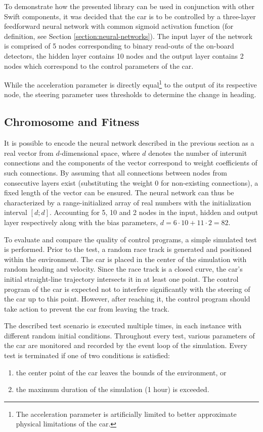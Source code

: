To demonstrate how the presented library can be used in conjunction with other Swift components, it was decided that the car is to be controlled by a three-layer feedforward neural network with common sigmoid activation function (for definition, see Section \ref{section:neural-networks}). The input layer of the network is comprised of 5 nodes corresponding to binary read-outs of the on-board detectors, the hidden layer contains 10 nodes and the output layer contains 2 nodes which correspond to the control parameters of the car.

While the acceleration parameter is directly equal\footnote{The acceleration parameter is artificially limited to better approximate physical limitations of the car.} to the output of its respective node, the steering parameter uses thresholds to determine the change in heading.

\subsection{Chromosome and Fitness}
It is possible to encode the neural network described in the previous section as a real vector from $d$-dimensional space, where $d$ denotes the number of interunit connections and the components of the vector correspond to weight coefficients of such connections. By assuming that all connections between nodes from consecutive layers exist (substituting the weight 0 for non-existing connections), a fixed length of the vector can be ensured. The neural network can thus be characterized by a range-initialized array of real numbers with the initialization interval $[d;d]$. Accounting for 5, 10 and 2 nodes in the input, hidden and output layer respectively along with the bias parameters, $d=6\cdot 10+11\cdot 2=82$.

To evaluate and compare the quality of control programs, a simple simulated test is performed. Prior to the test, a random race track is generated and positioned within the environment. The car is placed in the center of the simulation with random heading and velocity. Since the race track is a closed curve, the car's initial straight-line trajectory intersects it in at least one point. The control program of the car is expected not to interfere significantly with the steering of the car up to this point. However, after reaching it, the control program should take action to prevent the car from leaving the track.

The described test scenario is executed multiple times, in each instance with different random initial conditions. Throughout every test, various parameters of the car are monitored and recorded by the event loop of the simulation. Every test is terminated if one of two conditions is satisfied:
~
\begin{enumerate}
	\item the center point of the car leaves the bounds of the environment, or
	\item the maximum duration of the simulation (1 hour) is exceeded.
\end{enumerate}

